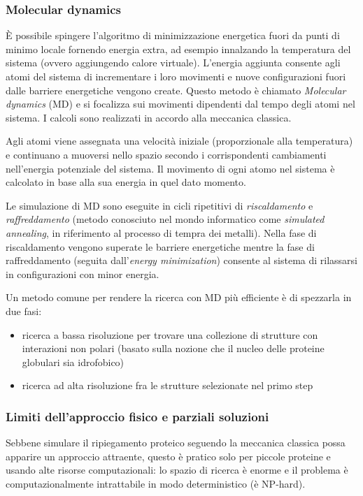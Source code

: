 {\subsubsection{Molecular dynamics}

È possibile spingere l'algoritmo di minimizzazione energetica fuori da punti di minimo locale fornendo energia extra, ad esempio innalzando la temperatura del sistema (ovvero aggiungendo calore virtuale). L'energia aggiunta consente agli atomi del sistema di incrementare i loro movimenti e nuove configurazioni fuori dalle barriere energetiche vengono create. Questo metodo è chiamato \textit{Molecular dynamics} (MD) e si focalizza sui movimenti dipendenti dal tempo degli atomi nel sistema. I calcoli sono realizzati in accordo alla meccanica classica. 

\par Agli atomi viene assegnata una velocità iniziale (proporzionale alla temperatura) e continuano a muoversi nello spazio secondo i corrispondenti cambiamenti nell'energia potenziale del sistema. Il movimento di ogni atomo nel sistema è calcolato in base alla sua energia in quel dato momento.

\par Le simulazione di MD sono eseguite in cicli ripetitivi di \textit{riscaldamento} e \textit{raffreddamento} (metodo conosciuto nel mondo informatico come \textit{simulated annealing}, in riferimento al processo di tempra dei metalli). Nella fase di riscaldamento vengono superate le barriere energetiche mentre la fase di raffreddamento (seguita dall'\textit{energy minimization}) consente al sistema di rilassarsi in configurazioni con minor energia.

\par Un metodo comune per rendere la ricerca con MD più efficiente è di spezzarla in due fasi:
\begin{itemize}
	\item ricerca a bassa risoluzione per trovare una collezione di strutture con interazioni non polari (basato sulla nozione che il nucleo delle proteine globulari sia idrofobico)
	\item ricerca ad alta risoluzione fra le strutture selezionate nel primo step
\end{itemize}

\subsubsection{Limiti dell'approccio fisico e parziali soluzioni}
Sebbene simulare il ripiegamento proteico seguendo la meccanica classica possa apparire un approccio attraente, questo è pratico solo per piccole proteine e usando alte risorse computazionali: lo spazio di ricerca è enorme e il problema è computazionalmente intrattabile in modo deterministico (è NP-hard)\supercite{abbass2020enhancing}.

}
